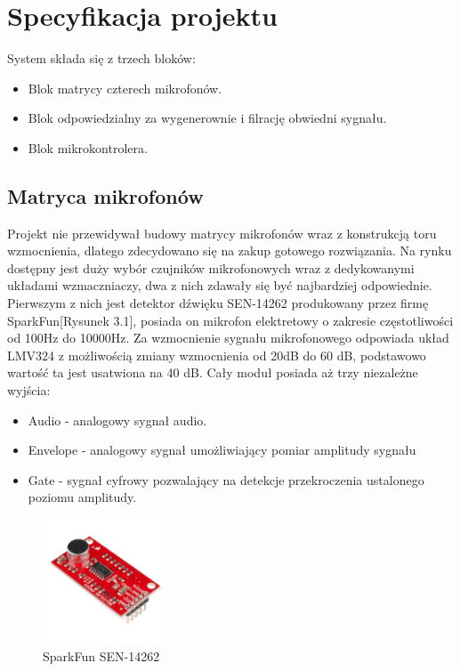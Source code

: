 \documentclass[eng,printmode]{mgr}
\begin{document}
\chapter{Specyfikacja projektu}
System składa się z trzech bloków:
\begin{itemize}
\item Blok matrycy czterech mikrofonów.
\item Blok odpowiedzialny za wygenerownie i filrację obwiedni sygnału. 
\item Blok mikrokontrolera.
\end{itemize}
\section{Matryca mikrofonów}
Projekt nie przewidywał budowy matrycy mikrofonów wraz z konstrukcją toru wzmocnienia, dlatego zdecydowano się na zakup gotowego rozwiązania. Na rynku dostępny jest duży wybór czujników mikrofonowych wraz z dedykowanymi układami wzmaczniaczy, dwa z nich zdawały się być najbardziej odpowiednie.\\
Pierwszym z nich jest detektor dźwięku SEN-14262 produkowany przez firmę SparkFun[Rysunek 3.1], posiada on mikrofon elektretowy o zakresie częstotliwości od 100Hz do 10000Hz. Za wzmocnienie sygnału mikrofonowego odpowiada układ LMV324 z możliwością zmiany wzmocnienia od 20dB do 60 dB, podstawowo wartość ta jest usatwiona na 40 dB. Cały moduł posiada aż trzy niezależne wyjścia:
\begin{itemize}
\item Audio - analogowy sygnał audio.
\item Envelope - analogowy sygnał umożliwiający pomiar amplitudy sygnału 
\item Gate - sygnał cyfrowy pozwalający na detekcje przekroczenia ustalonego poziomu amplitudy.
\end{itemize}

\begin{figure}

    \centering

  \includegraphics[width=0.33\textwidth, angle=0]{detektor1.jpg}

    \caption{SparkFun SEN-14262}

    

\end{figure}
\end{document}
